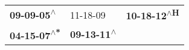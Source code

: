 \begin{supertabular}{lll}
  \textbf{09-09-05\textsuperscript{$\wedge$}} &                   11-18-09\textsuperscript{} &  \textbf{10-18-12\textsuperscript{$\wedge$H}} \\
 \textbf{04-15-07\textsuperscript{$\wedge$*}} &  \textbf{09-13-11\textsuperscript{$\wedge$}} &                                               \\
\end{supertabular}
